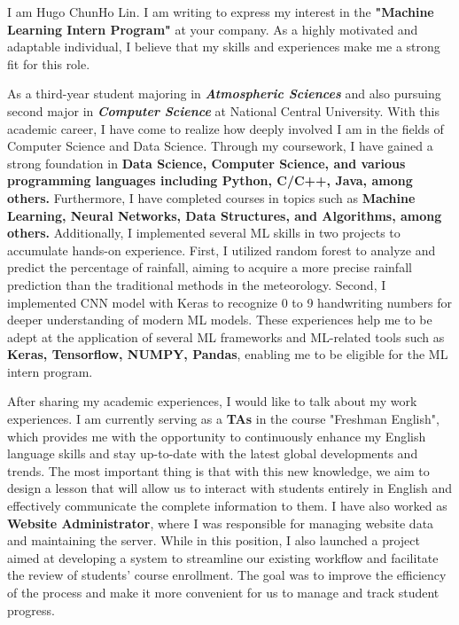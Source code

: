 
I am Hugo ChunHo Lin. I am writing to express my interest in the \textbf{"Machine Learning Intern Program"} at your company. As a highly motivated and adaptable individual, I believe that my skills and experiences make me a strong fit for this role.

As a third-year student majoring in \textbf{\emph{Atmospheric Sciences}} and also pursuing second major in \textbf{\emph{Computer Science}} at National Central University. With this academic career, I have come to realize how deeply involved I am in the fields of Computer Science and Data Science. Through my coursework, I have gained a strong foundation in \textbf{Data Science, Computer Science, and various programming languages including Python, C/C++, Java, among others.} Furthermore, I have completed courses in topics such as \textbf{Machine Learning, Neural Networks, Data Structures, and Algorithms, among others.}
Additionally, I implemented several ML skills in two projects to accumulate hands-on experience. 
First, I utilized random forest to analyze and predict the percentage of rainfall, aiming to acquire a more precise rainfall prediction than the traditional methods in the meteorology. 
Second, I implemented CNN model with Keras to recognize 0 to 9 handwriting numbers for deeper understanding of modern ML models. These experiences help me to be adept at the application of several ML frameworks and ML-related tools such as \textbf{Keras, Tensorflow, NUMPY, Pandas}, enabling me to be eligible for the ML intern program.


After sharing my academic experiences, I would like to talk about my work experiences.
I am currently serving as a \textbf{TAs} in the course "Freshman English", which provides me with the opportunity to continuously enhance my English language skills and stay up-to-date with the latest global developments and trends. The most important thing is that with this new knowledge, we aim to design a lesson that will allow us to interact with students entirely in English and effectively communicate the complete information to them.
I have also worked as \textbf{Website Administrator}, where I was responsible for managing website data and maintaining the server. While in this position, 
I also launched a project aimed at developing a system to streamline our existing workflow and facilitate the review of students' course enrollment. The goal was to improve the efficiency of the process and make it more convenient for us to manage and track student progress.

